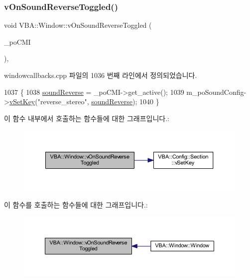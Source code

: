 \subsubsection{\texorpdfstring{v\+On\+Sound\+Reverse\+Toggled()}{vOnSoundReverseToggled()}}
{\footnotesize\ttfamily void V\+B\+A\+::\+Window\+::v\+On\+Sound\+Reverse\+Toggled (\begin{DoxyParamCaption}\item[{Gtk\+::\+Check\+Menu\+Item $\ast$}]{\+\_\+po\+C\+MI }\end{DoxyParamCaption})\hspace{0.3cm}{\ttfamily [protected]}, {\ttfamily [virtual]}}



windowcallbacks.\+cpp 파일의 1036 번째 라인에서 정의되었습니다.


\begin{DoxyCode}
1037 \{
1038   \mbox{\hyperlink{gb_sound_8cpp_a34a44cbcbdf585c7e2f1e17948600c1f}{soundReverse}} = \_poCMI->get\_active();
1039   m\_poSoundConfig->\mbox{\hyperlink{class_v_b_a_1_1_config_1_1_section_a57e1b95cbea40db71c093381beff4b0e}{vSetKey}}(\textcolor{stringliteral}{"reverse\_stereo"}, \mbox{\hyperlink{gb_sound_8cpp_a34a44cbcbdf585c7e2f1e17948600c1f}{soundReverse}});
1040 \}
\end{DoxyCode}
이 함수 내부에서 호출하는 함수들에 대한 그래프입니다.\+:
\nopagebreak
\begin{figure}[H]
\begin{center}
\leavevmode
\includegraphics[width=350pt]{class_v_b_a_1_1_window_a1b7f801dd8f6c48c9161314e4ed266ed_cgraph}
\end{center}
\end{figure}
이 함수를 호출하는 함수들에 대한 그래프입니다.\+:
\nopagebreak
\begin{figure}[H]
\begin{center}
\leavevmode
\includegraphics[width=350pt]{class_v_b_a_1_1_window_a1b7f801dd8f6c48c9161314e4ed266ed_icgraph}
\end{center}
\end{figure}
\mbox{\label{class_v_b_a_1_1_window_af883be4dc5fbd611a2b5610aa26cfff7}} 
